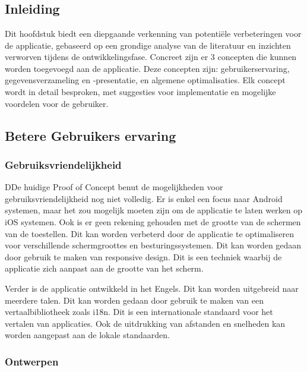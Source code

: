 \chapter{}%
\label{ch:verbeteringen}

\section{Inleiding}
Dit hoofdstuk biedt een diepgaande verkenning van potentiële verbeteringen voor de applicatie, gebaseerd op een grondige analyse van de literatuur en inzichten verworven tijdens de ontwikkelingsfase. Concreet zijn er 3 concepten die kunnen worden toegevoegd aan de applicatie. Deze concepten zijn: gebruikerservaring, gegevensverzameling en -presentatie, en algemene optimalisaties. Elk concept wordt in detail besproken, met suggesties voor implementatie en mogelijke voordelen voor de gebruiker.

\section{Betere Gebruikers ervaring}

\subsection{Gebruiksvriendelijkheid}

DDe huidige Proof of Concept benut de mogelijkheden voor gebruiksvriendelijkheid nog niet volledig. Er is enkel een focus naar Android systemen, maar het zou mogelijk moeten zijn om de applicatie te laten werken op iOS systemen. Ook is er geen rekening gehouden met de grootte van de schermen van de toestellen. Dit kan worden verbeterd door de applicatie te optimaliseren voor verschillende schermgroottes en besturingssystemen. Dit kan worden gedaan door gebruik te maken van responsive design. Dit is een techniek waarbij de applicatie zich aanpast aan de grootte van het scherm. 

Verder is de applicatie ontwikkeld in het Engels. Dit kan worden uitgebreid naar meerdere talen. Dit kan worden gedaan door gebruik te maken van een vertaalbibliotheek zoals i18n. Dit is een internationale standaard voor het vertalen van applicaties. Ook de uitdrukking van afstanden en snelheden kan worden aangepast aan de lokale standaarden.

\subsection{Ontwerpen}

